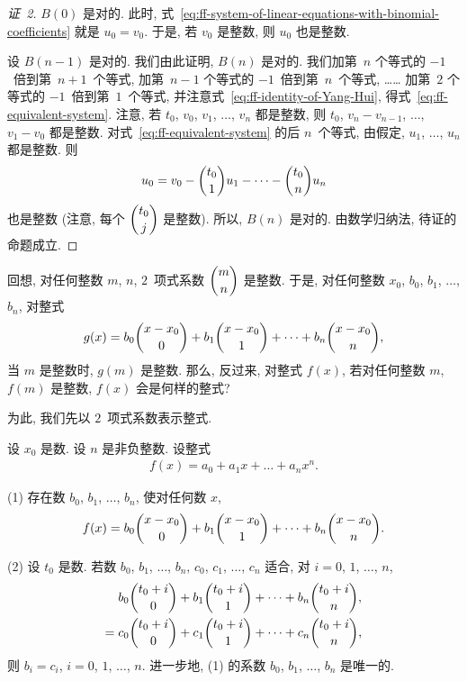 \documentclass[../libro.tex]{subfiles}
\begin{document}
\begin{proof}[证~2]
    \(B(0)\) 是对的.
    此时, 式~\eqref{eq:ff-system-of-linear-equations-with-binomial-coefficients}
    就是 \(u_0 = v_0\).
    于是, 若 \(v_0\) 是整数, 则 \(u_0\) 也是整数.

    设 \(B(n-1)\) 是对的.
    我们由此证明, \(B(n)\) 是对的.
    我们加第~\(n\) 个等式的 \(-1\)~倍到第~\(n+1\)~个等式,
    加第~\(n-1\) 个等式的 \(-1\)~倍到第~\(n\)~个等式,
    ……
    加第~\(2\) 个等式的 \(-1\)~倍到第~\(1\)~个等式,
    并注意式~\eqref{eq:ff-identity-of-Yang-Hui},
    得式~\eqref{eq:ff-equivalent-system}.
    注意, 若 \(t_0\), \(v_0\), \(v_1\), \(\dots\), \(v_n\) 都是整数,
    则 \(t_0\), \(v_n - v_{n-1}\), \(\dots\), \(v_1 - v_0\) 都是整数.
    对式~\eqref{eq:ff-equivalent-system} 的后 \(n\)~个等式,
    由假定, \(u_1\), \(\dots\), \(u_n\) 都是整数.
    则
    \begin{align*}
        u_0 = v_0 - \dbinom{t_0}{1} u_1 - \dots - \dbinom{t_0}{n} u_n
    \end{align*}
    也是整数
    (注意, 每个 \(\dbinom{t_0}{j}\) 是整数).
    所以, \(B(n)\) 是对的.
    由数学归纳法, 待证的命题成立.
\end{proof}

回想, 对任何整数 \(m\), \(n\),
\(2\)~项式系数 \(\dbinom{m}{n}\) 是整数.
于是, 对任何整数
\(x_0\), \(b_0\), \(b_1\), \(\dots\), \(b_n\),
对整式
\begin{align*}
    g(x)
    = b_0 \dbinom{x-x_0}{0} + b_1 \dbinom{x-x_0}{1} + \dots + b_n \dbinom{x-x_0}{n},
\end{align*}
当 \(m\) 是整数时, \(g(m)\) 是整数.
那么, 反过来, 对整式 \(f(x)\),
若对任何整数 \(m\), \(f(m)\) 是整数,
\(f(x)\) 会是何样的整式?

为此, 我们先以 \(2\)~项式系数表示整式.

\begin{theorem}
    设 \(x_0\) 是数.
    设 \(n\) 是非负整数.
    设整式
    \begin{align*}
        f(x) = a_0 + a_1 x + \dots + a_n x^n.
    \end{align*}

    (1)
    存在数 \(b_0\), \(b_1\), \(\dots\), \(b_n\),
    使对任何数 \(x\),
    \begin{align*}
        f(x) = b_0 \dbinom{x-x_0}{0}
        + b_1 \dbinom{x-x_0}{1} + \dots + b_n \dbinom{x-x_0}{n}.
    \end{align*}

    (2)
    设 \(t_0\) 是数.
    若数 \(b_0\), \(b_1\), \(\dots\), \(b_n\),
    \(c_0\), \(c_1\), \(\dots\), \(c_n\)
    适合,
    对 \(i = 0\), \(1\), \(\dots\), \(n\),
    \begin{align*}
        &
        b_0 \dbinom{t_0+i}{0} + b_1 \dbinom{t_0+i}{1}
        + \dots + b_n \dbinom{t_0+i}{n},
        \\
        = {} &
        c_0 \dbinom{t_0+i}{0} + c_1 \dbinom{t_0+i}{1}
        + \dots + c_n \dbinom{t_0+i}{n},
    \end{align*}
    则 \(b_i = c_i\), \(i = 0\), \(1\), \(\dots\), \(n\).
    进一步地, (1) 的系数 \(b_0\), \(b_1\), \(\dots\), \(b_n\) 是唯一的.
\end{theorem}
\end{document}
